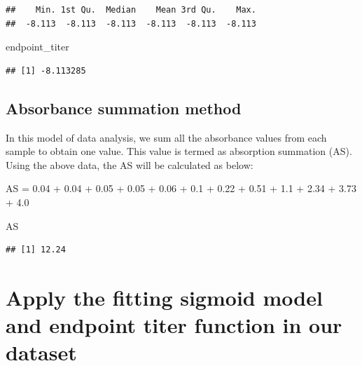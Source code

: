 \documentclass[
]{book}
\newenvironment{Shaded}{\begin{snugshade}}{\end{snugshade}}
\newcommand{\FloatTok}[1]{\textcolor[rgb]{0.00,0.00,0.81}{#1}}
\newcommand{\NormalTok}[1]{#1}
\newcommand{\OtherTok}[1]{\textcolor[rgb]{0.56,0.35,0.01}{#1}}
\newcommand{\SpecialCharTok}[1]{\textcolor[rgb]{0.00,0.00,0.00}{#1}}
\begin{document}
\begin{verbatim}
##    Min. 1st Qu.  Median    Mean 3rd Qu.    Max. 
##  -8.113  -8.113  -8.113  -8.113  -8.113  -8.113
\end{verbatim}

\begin{Shaded}
\begin{Highlighting}[]
\NormalTok{endpoint\_titer}
\end{Highlighting}
\end{Shaded}

\begin{verbatim}
## [1] -8.113285
\end{verbatim}

\hypertarget{absorbance-summation-method}{%
\subsection{Absorbance summation method}\label{absorbance-summation-method}}

In this model of data analysis, we sum all the absorbance values from each sample to obtain one value. This value is termed as absorption summation (AS). Using the above data, the AS will be calculated as below:

\begin{Shaded}
\begin{Highlighting}[]
\NormalTok{AS }\OtherTok{=} \FloatTok{0.04} \SpecialCharTok{+} \FloatTok{0.04} \SpecialCharTok{+} \FloatTok{0.05} \SpecialCharTok{+} \FloatTok{0.05} \SpecialCharTok{+} \FloatTok{0.06} \SpecialCharTok{+} 
  \FloatTok{0.1} \SpecialCharTok{+} \FloatTok{0.22} \SpecialCharTok{+} \FloatTok{0.51} \SpecialCharTok{+} \FloatTok{1.1} \SpecialCharTok{+} \FloatTok{2.34} \SpecialCharTok{+} \FloatTok{3.73} \SpecialCharTok{+} \FloatTok{4.0}

\NormalTok{AS}
\end{Highlighting}
\end{Shaded}

\begin{verbatim}
## [1] 12.24
\end{verbatim}

\hypertarget{apply-the-fitting-sigmoid-model-and-endpoint-titer-function-in-our-dataset}{%
\section{Apply the fitting sigmoid model and endpoint titer function in our dataset}\label{apply-the-fitting-sigmoid-model-and-endpoint-titer-function-in-our-dataset}}
\end{document}
